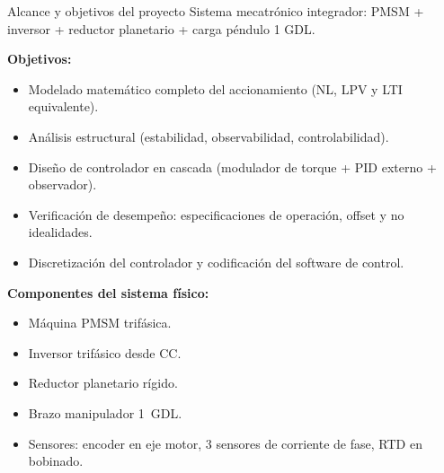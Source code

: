 \documentclass[aspectratio=169,t]{beamer}
\begin{document}
\begin{frame}{Alcance y objetivos del proyecto}
  {\small\color{uncGray}Sistema mecatrónico integrador: PMSM + inversor + reductor planetario + carga péndulo 1 GDL.}\par
  \vspace{4mm}

  \textbf{Objetivos:}
  \begin{itemize}
    \item Modelado matemático completo del accionamiento (NL, LPV y LTI equivalente).
    \item Análisis estructural (estabilidad, observabilidad, controlabilidad).
    \item Diseño de controlador en cascada (modulador de torque + PID externo + observador).
    \item Verificación de desempeño: especificaciones de operación, offset y no idealidades.
    \item Discretización del controlador y codificación del software de control.
  \end{itemize}

  \vspace{3mm}
  \textbf{Componentes del sistema físico:}
  \begin{itemize}
    \item Máquina PMSM trifásica.
    \item Inversor trifásico desde CC.
    \item Reductor planetario rígido.
    \item Brazo manipulador 1~GDL.
    \item Sensores: encoder en eje motor, 3 sensores de corriente de fase, RTD en bobinado.
  \end{itemize}
\end{frame}
\end{document}
